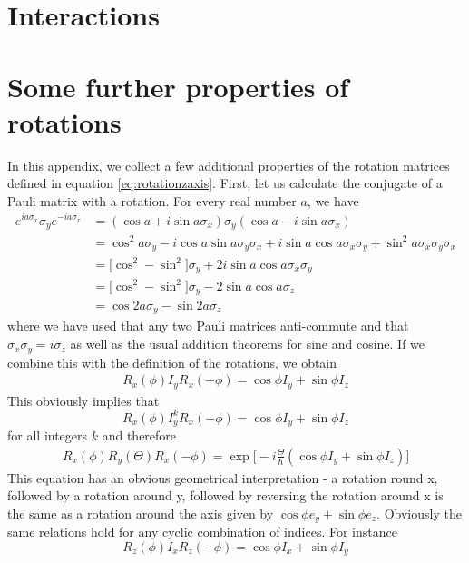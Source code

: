 \documentclass[a4paper, draft]{article}
\theoremstyle{own}
\theoremstyle{remark}
\begin{document}
\section{Interactions}



\appendix

\section{Some further properties of rotations}\label{app:rotations}


In this appendix, we collect a few additional properties of the rotation matrices defined in equation \eqref{eq:rotationzaxis}. First, let us calculate the conjugate of a Pauli matrix with a rotation. For every real number $a$, we have
\begin{align*}
e^{ia\sigma_x} \sigma_y e^{-ia\sigma_x} &= (\cos a + i \sin a \sigma_x) \sigma_y (\cos a - i \sin a \sigma_x) \\&= \cos^2 a \sigma_y  -i \cos a \sin a \sigma_y \sigma_x 
+ i \sin a \cos a \sigma_x \sigma_y
+ \sin^2 a \sigma_x \sigma_y \sigma_x \\
&= \big[ \cos^2 -\sin^2 \big] \sigma_y + 2 i \sin a \cos a \sigma_x \sigma_y \\
&= \big[ \cos^2 -\sin^2 \big] \sigma_y - 2 \sin a \cos a \sigma_z \\
&= \cos 2a \sigma_y - \sin 2a \sigma_z
\end{align*}
where we have used that any two Pauli matrices anti-commute and that $\sigma_x \sigma_y = i \sigma_z$ as well as the usual addition theorems for sine and cosine. If we combine this with the definition of the rotations, we obtain
\begin{align}
\label{eq:infinitesimalsandwich}
R_x(\phi) I_y R_x(-\phi) = \cos \phi I_y + \sin \phi I_z
\end{align}
This obviously implies that
$$
R_x(\phi) I_y^k R_x(-\phi) = \cos \phi I_y + \sin \phi I_z
$$
for all integers $k$ and therefore
\begin{align}
R_x(\phi) R_y(\Theta) R_x(-\phi) = \exp 
\big[ -i \frac{\Theta}{\hbar} (\cos \phi I_y + \sin \phi I_z)      \big] 
\end{align}
This equation has an obvious geometrical interpretation - a rotation round x, followed by a rotation around y, followed by reversing the rotation around x is the same as a rotation around the axis given by $\cos \phi e_y + \sin \phi e_z$. Obviously the same relations hold for any cyclic combination of indices. For instance
$$
R_z(\phi) I_x R_z(-\phi) = \cos \phi I_x + \sin \phi I_y
$$
\end{document}
